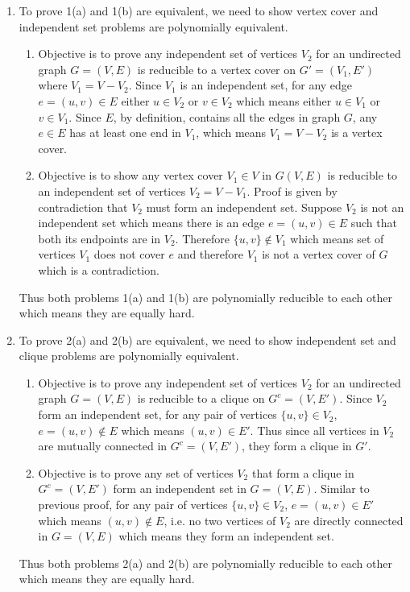 \begin{enumerate}
  \item To prove 1(a) and 1(b) are equivalent, we need to show vertex cover and independent set problems are polynomially equivalent.
  \begin{enumerate}
    \item Objective is to prove any independent set of vertices $V_2$ for an undirected graph $G = (V, E)$ is reducible to a vertex cover on $G' = (V_1, E')$ where $V_1 = V - V_2$.
    Since $V_1$ is an independent set, for any edge $e = (u,v) \in E$ either $u\in V_2$ or $v\in V_2$ which means either $u \in V_1$ or $v \in V_1$. Since $E$, by definition, contains all the edges in graph $G$, any $e \in E$ has at least one end in $V_1$, which means $V_1 = V - V_2$ is a vertex cover.
    \item Objective is to show any vertex cover $V_1 \in V$ in $G(V, E)$ is reducible to an independent set of vertices $V_2 = V - V_1$. Proof is given by contradiction that $V_2$ must form an independent set. Suppose $V_2$ is not an independent set which means there is an edge $e = (u,v) \in E$ such that both its endpoints are in $V_2$. Therefore $\{u, v\} \notin V_1$ which means set of vertices $V_1$ does not cover $e$ and therefore $V_1$ is not a vertex cover of $G$ which is a contradiction.
  \end{enumerate}
  Thus both problems 1(a) and 1(b) are polynomially reducible to each other which means they are equally hard.
  \item To prove 2(a) and 2(b) are equivalent, we need to show independent set and clique problems are polynomially equivalent.
  \begin{enumerate}
    \item Objective is to prove any independent set of vertices $V_2$ for an undirected graph $G = (V, E)$ is reducible to a clique on $G^c = (V, E')$. Since $V_2$ form an independent set, for any pair of vertices $\{u, v\} \in V_2$, $e = (u, v) \notin E$ which means $(u, v) \in E'$. Thus since all vertices in $V_2$ are mutually connected in $G^c = (V, E')$, they form a clique in $G'$.
    \item Objective is to prove any set of vertices $V_2$ that form a clique in $G^c=(V, E')$ form an independent set in $G = (V, E)$. Similar to previous proof, for any pair of vertices $\{u, v\}\in V_2$, $e = (u, v) \in E'$ which means $(u,v) \notin E$, i.e. no two vertices of $V_2$ are directly connected in $G=(V,E)$ which means they form an independent set.
  \end{enumerate}
  Thus both problems 2(a) and 2(b) are polynomially reducible to each other which means they are equally hard.
\end{enumerate}
